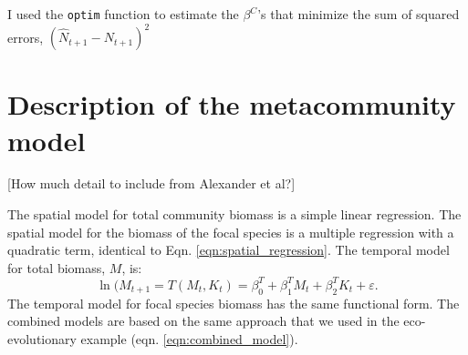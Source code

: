\documentclass[11pt]{article}
\begin{document}
I used the \texttt{optim} function to estimate the $\beta^C$'s that minimize the sum of squared errors, $(\hat{N}_{t+1} - N_{t+1})^2$

\section{Description of the metacommunity model}

[How much detail to include from Alexander et al?]

The spatial model for total community biomass is a simple linear regression. The spatial model for the biomass of the focal species is a multiple regression with a quadratic term, identical to Eqn. \ref{eqn:spatial_regression}. The temporal model for total biomass, $M$, is:
 \begin{equation}
 \ln(M_{t+1} = T(M_{t},K_t) = \beta^T_0 +  \beta^T_1 M_t +\beta^T_2 K_t  +  \varepsilon .
 \label{eqn:community_temporal_regression}
 \end{equation}
The temporal model for focal species biomass has the same functional form. The combined models are based on the same approach that we used in the eco-evolutionary example (eqn. \ref{eqn:combined_model}).
\end{document}
